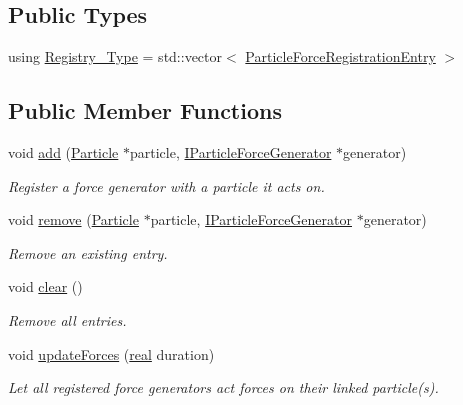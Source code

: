 \subsection*{Public Types}
\begin{DoxyCompactItemize}
\item 
using \mbox{\hyperlink{classr3_1_1_particle_force_registry_ae769e654dbf539cf09c514e47768498c}{Registry\+\_\+\+Type}} = std\+::vector$<$ \mbox{\hyperlink{structr3_1_1_particle_force_registry_1_1_particle_force_registration_entry}{Particle\+Force\+Registration\+Entry}} $>$
\end{DoxyCompactItemize}
\subsection*{Public Member Functions}
\begin{DoxyCompactItemize}
\item 
void \mbox{\hyperlink{classr3_1_1_particle_force_registry_a11cb053992645af9af2ccd5f98783cae}{add}} (\mbox{\hyperlink{classr3_1_1_particle}{Particle}} $\ast$particle, \mbox{\hyperlink{classr3_1_1_i_particle_force_generator}{I\+Particle\+Force\+Generator}} $\ast$generator)
\begin{DoxyCompactList}\small\item\em Register a force generator with a particle it acts on. \end{DoxyCompactList}\item 
void \mbox{\hyperlink{classr3_1_1_particle_force_registry_adadb8aa711eea04ae1466a69b008aa83}{remove}} (\mbox{\hyperlink{classr3_1_1_particle}{Particle}} $\ast$particle, \mbox{\hyperlink{classr3_1_1_i_particle_force_generator}{I\+Particle\+Force\+Generator}} $\ast$generator)
\begin{DoxyCompactList}\small\item\em Remove an existing entry. \end{DoxyCompactList}\item 
void \mbox{\hyperlink{classr3_1_1_particle_force_registry_ac49c38fa041447278c56e68c6e796d77}{clear}} ()
\begin{DoxyCompactList}\small\item\em Remove all entries. \end{DoxyCompactList}\item 
void \mbox{\hyperlink{classr3_1_1_particle_force_registry_aff16efc19c65d28e39a38cbc936ede2a}{update\+Forces}} (\mbox{\hyperlink{namespacer3_ab2016b3e3f743fb735afce242f0dc1eb}{real}} duration)
\begin{DoxyCompactList}\small\item\em Let all registered force generators act forces on their linked particle(s). \end{DoxyCompactList}\end{DoxyCompactItemize}
